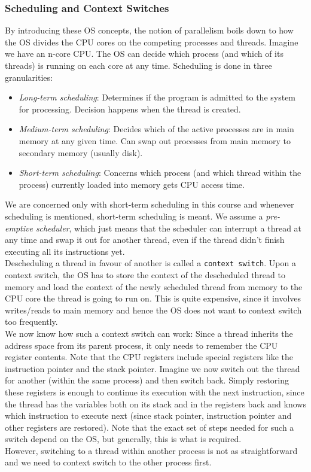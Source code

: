 \documentclass[main]{subfiles}
\begin{document}
\subsubsection{Scheduling and Context Switches}
By introducing these OS concepts, the notion of parallelism boils down to how the OS divides the CPU cores on the competing processes and threads. Imagine we have an n-core CPU. The OS can decide which process (and which of its threads) is running on each core at any time. Scheduling is done in three granularities:
\begin{itemize}
    \item \textit{Long-term scheduling}: Determines if the program is admitted to the system for processing. Decision happens when the thread is created.
    \item \textit{Medium-term scheduling}: Decides which of the active processes are in main memory at any given time. Can swap out processes from main memory to secondary memory (usually disk).
    \item \textit{Short-term scheduling}: Concerns which process (and which thread within the process) currently loaded into memory gets CPU access time.
\end{itemize}
We are concerned only with short-term scheduling in this course and whenever scheduling is mentioned, short-term scheduling is meant. We assume a \textit{pre-emptive scheduler}, which just means that the scheduler can interrupt a thread at any time and swap it out for another thread, even if the thread didn't finish executing all its instructions yet.\\[3mm]
Descheduling a thread in favour of another is called a \texttt{context switch}. Upon a context switch, the OS has to store the context of the descheduled thread to memory and load the context of the newly scheduled thread from memory to the CPU core the thread is going to run on. This is quite expensive, since it involves writes/reads to main memory and hence the OS does not want to context switch too frequently.\\[3mm]
We now know how such a context switch can work: Since a thread inherits the address space from its parent process, it only needs to remember the CPU register contents. Note that the CPU registers include special registers like the instruction pointer and the stack pointer. Imagine we now switch out the thread for another (within the same process) and then switch back. Simply restoring these registers is enough to continue its execution with the next instruction, since the thread has the variables both on its stack and in the registers back and knows which instruction to execute next (since stack pointer, instruction pointer and other registers are restored). Note that the exact set of steps needed for such a switch depend on the OS, but generally, this is what is required.\\[3mm]
However, switching to a thread within another process is not as straightforward and we need to context switch to the other process first.
\end{document}
